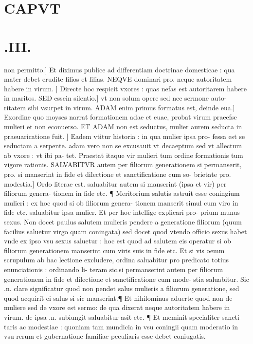 \documentclass{article}
\begin{document}
\begin{pages}
\section*{CAPVT }
\section*{.III. }
\marginpar{[ p.142 ]}\pstart non permitto.] Et diximus publice  ad differentiam doctrinae domesticae : qua mater debet erudite filios et filias. NEQVE dominari pro. neque  autoritatem habere  in virum. ] Directe hoc respicit vxores : quas nefas est autoritarem habere in maritos. SED essein silentio.] vt non solum opere sed nec sermone auto- ritatem sibi vsurpet in virum. ADAM enim primus formatus est, deinde eua.] Exordine quo moyses narrat formationem adae et euae, probat virum praeefse mulieri et non econuerso. ET ADAM non est seductus, mulier aurem seducta in praeuaricatione fuit. ] Eadem vtitur historia : in qua mulier ipsa pro- fessa est se seductam a serpente. adam vero non se excusauit vt decaeptum  sed vt allectum ab vxore : vt ibi pa- tet. Praestat itaque  vir mulieri tum ordine formationis  tum vigore rationis. SALVABITVR autem per filiorum generationem si permanserit, pro. si manserint  in fide et dilectione et sanctificatione cum so- brietate pro. modestia.] Ordo literae est. saluabitur autem si manserint (ipsa et vir) per filiorum genera- tionem in fide etc. ¶ Meritorium salutis astruit esse coningium mulieri : ex hoc quod si ob filiorum genera- tionem manserit simul cum viro in fide etc. saluabitur ipsa mulier. Et per hoc intellige explicari pro- prium munus sexus. Non docet paulus salutem mulieris pendere a generatione filiorum (quum facilius saluetur virgo quam coningata) sed docet quod vtendo officio sexus  habet vnde ex ipso vsu sexus saluetur : hoc est quod ad salutem eis operatur si ob filiorum generationem manserint cum viris suis in fide etc.  Et si vis oemm scrupulum ab hac lectione excludere, ordina saluabitur pro predicato totius enunciationis : ordinando li- teram sic.si permanserint autem per filiorum generationem in fide et dilectione et sanctificatione cum mode- stia  saluabitur. Sic .n. clare significatur quod non pendet salus mulieris a filiorum generatione, sed quod acquirit̃ ei salus si sic manserint.¶ Et nihilominus aduerte quod non de muliere sed de vxore est sermo: de qua dixerat neque  autoritatem habere in virum. de ipsa .n. subiungit saluabitur asit etc.  ¶ Et meminit specialiter sancti- taris ac modestiae : quoniam tam mundicia in vsu coningii quam moderatio in vsu rerum et gubernatione familiae  peculiaris esse debet coniugatis.  \pend

\end{pages}
\end{document}
